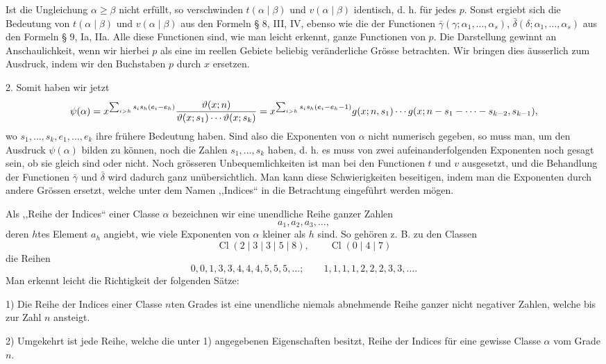 \documentclass[11pt,a4paper]{article}
\newcommand{\Cl}{\operatorname{Cl}}
\begin{document}
Ist die Ungleichung $\alpha\ge\beta$ nicht erfüllt, so verschwinden $t(\alpha\mid\beta)$ und $v(\alpha\mid\beta)$ identisch, d. h. für jedes $p$. Sonst ergiebt sich die Bedeutung von $t(\alpha\mid\beta)$ und $v(\alpha\mid\beta)$ aus den Formeln § 8, III, IV, ebenso wie die der Functionen $\bar\gamma(\gamma;\alpha_1,\ldots,\alpha_s)$, $\bar\delta(\delta;\alpha_1,\ldots,\alpha_s)$ aus den Formeln § 9, Ia, IIa. Alle diese Functionen sind, wie man leicht erkennt, ganze Functionen von $p$. Die Darstellung gewinnt an Anschaulichkeit, wenn wir hierbei $p$ als eine im reellen Gebiete beliebig veränderliche Grösse betrachten. Wir bringen dies äusserlich zum Ausdruck, indem wir den Buchstaben $p$ durch $x$ ersetzen.

2. Somit haben wir jetzt
\[
 \psi(\alpha)=x^{\sum_{i>h}s_i s_h(e_i-e_h)}
 {\vartheta(x;n)\over \vartheta(x;s_1)\cdots\vartheta(x;s_k)}
 =x^{\sum_{i>h}s_i s_h(e_i-e_h-1)}
 g(x;n,s_1)\cdots g(x;n-s_1-\cdots-s_{k-2},s_{k-1}),
\]
wo $s_1,\ldots,s_k,e_1,\ldots,e_k$ ihre frühere Bedeutung haben. Sind also die Exponenten von $\alpha$ nicht numerisch gegeben, so muss man, um den Ausdruck $\psi(\alpha)$ bilden zu können, noch die Zahlen $s_1,\ldots,s_k$ haben, d. h. es muss von zwei aufeinanderfolgenden Exponenten noch gesagt sein, ob sie gleich sind oder nicht. Noch grösseren Unbequemlichkeiten ist man bei den Functionen $t$ und $v$ ausgesetzt, und die Behandlung der Functionen $\bar\gamma$ und $\bar\delta$ wird dadurch ganz unübersichtlich. Man kann diese Schwierigkeiten beseitigen, indem man die Exponenten durch andere Grössen ersetzt, welche unter dem Namen ,,Indices`` in die Betrachtung eingeführt werden mögen.

Als ,,Reihe der Indices`` einer Classe $\alpha$ bezeichnen wir eine unendliche Reihe ganzer Zahlen
\[
 a_1,a_2,a_3,\ldots,
\]
deren $h$tes Element $a_h$ angiebt, wie viele Exponenten von $\alpha$ kleiner als $h$ sind. So gehören z. B. zu den Classen
\[
 \Cl(2\mid3\mid3\mid5\mid8),\qquad \Cl(0\mid4\mid7)
\]
die Reihen
\[
 0,0,1,3,3,4,4,4,5,5,5,\ldots;
 \qquad
 1,1,1,1,2,2,2,3,3,\ldots.
\]
Man erkennt leicht die Richtigkeit der folgenden Sätze:

1) Die Reihe der Indices einer Classe $n$ten Grades ist eine unendliche niemals abnehmende Reihe ganzer nicht negativer Zahlen, welche bis zur Zahl $n$ ansteigt.

2) Umgekehrt ist jede Reihe, welche die unter 1) angegebenen Eigenschaften besitzt, Reihe der Indices für eine gewisse Classe $\alpha$ vom Grade $n$.
\end{document}
